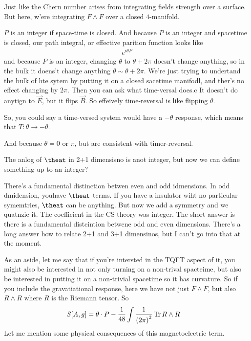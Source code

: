 Just like the Chern number arises from integrating fields strength over a
surface.
But here, w'ere integrating $F\wedge F$ over a closed $4$-manifold.

$P$ is an integer if space-time is closed.
And because $P$ is an integer and spacetime is closed,
our path integral,
or effective parition function looks like
\begin{align}
    e^{i\theta P}
\end{align}
and because $P$ is an integer,
changing $\theta$ to $\theta+2\pi$ doesn't change anything,
so in the bulk it doens't change anything
$\theta \sim \theta + 2\pi$.
We're just trying to undertand the bulk of hte sytem by putting it on a closed
sacetime manifodl,
and ther's no effect changing by $2\pi$.
Then you can ask what time-versal does.c
It doesn't do anytign to $\vec{E}$, 
but it flips $\vec{B}$.
So effeively time-reversal is like flipping $\theta$.

So, you could say a time-versed system would have a $-\theta$ response,
which means that $T:\theta \to -\theta$.

And because $\theta=0$ or $\pi$,
but are consistent with timer-reversal.

\begin{question}
    The anlog of $\theat$ in 2+1 dimensisno is anot integer,
    but now we can define something up to an integer?
\end{question}
There's a fundamental distinction betwen even and odd idmensions.
In odd dmidension,
youhave $\theat$ terms.
If you have a insulator wiht no particular symemtries,
$\theat$ can be anything.
But now we add a symmetry and we quatnzie it.
The coefficient in the CS theory was integer.
The short answer is there is a fundamental distcintion betwene odd and even
dimensions.
There's a long answer how to relate 2+1 and 3+1 dimensinos,
but I can't go into that at the moment.

As an aside,
let me say that if you're intersted in the TQFT aspect of it,
you might also be interested in not only turning on a non-trival spacteime,
but also be interested in putting it on a non-trivial spacetime so it has
curvature.
So if you include the gravatiational response,
here we have not just $F\wedge F$,
but also $R\wedge R$ where $R$ is the Riemann tensor.
So
\begin{align}
    S[A, g] &=
    \theta\cdot P
    -
    \frac{1}{48} \int \frac{1}{\left( 2\pi \right)^2} \Tr R\wedge R
\end{align}
Let me mention some physical consequences of this magnetoelectric term.

